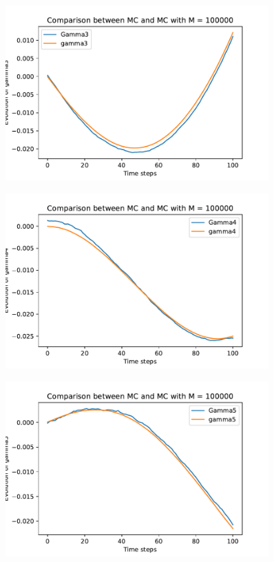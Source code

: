\documentclass[a4paper,11pt,openright]{report}
\begin{document}
\begin{figure}[H]
\centering
\includegraphics[width=0.9\textwidth]{gamma3 MC = 100000.pdf}
\end{figure}
\begin{figure}[H]
\centering
\includegraphics[width=0.9\textwidth]{gamma4 MC = 100000.pdf}
\end{figure}
\begin{figure}[H]
\centering
\includegraphics[width=0.9\textwidth]{gamma5 MC = 100000.pdf}
\end{figure}
\newpage
\end{document}
